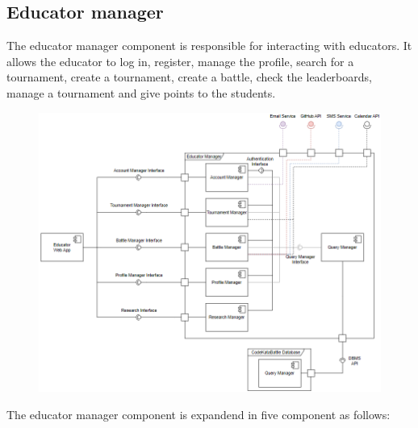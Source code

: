 \documentclass[12pt, a4paper]{report}
\begin{document}
    \subsection{Educator manager}
    The educator manager component is responsible for interacting with educators.
    It allows the educator to log in, register, manage the profile, search for a tournament, create a tournament, create a battle, check the leaderboards, manage a tournament and give points to the students. 
    \begin{figure}[H]
        \centering
        \includegraphics[width=0.8\linewidth]{images/component_view_educator.png}
    \end{figure}
    The educator manager component is expandend in five component as follows: 
\end{document}
